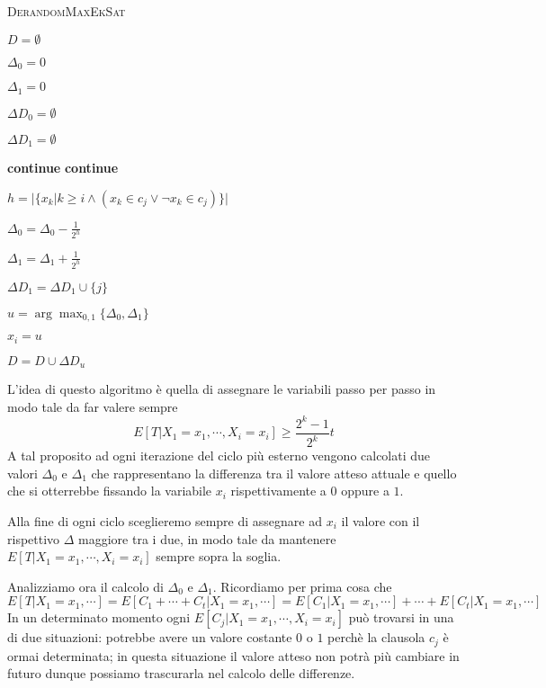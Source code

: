 \begin{algorithm}[h]
	\caption{\textsc{DerandomMaxEkSat}}
	\label{algo:DerandomMaxEkSat}

	$D = \emptyset$ 

	{
		$\Delta_0 = 0$

		$\Delta_1 = 0$

		$\Delta D_0 = \emptyset$

		$\Delta D_1 = \emptyset$

		{
			{
				\textbf{continue}
			}
			{
				\textbf{continue}
			}

			$h = |\{x_k | k \geq i \land (x_k \in c_j \lor \neg x_k \in c_j)\}|$ 

			{

				$\Delta_0 = \Delta_0 - \frac{1}{2^h}$

				$\Delta_1 = \Delta_1 + \frac{1}{2^h}$

				$\Delta D_1 = \Delta D_1 \cup \{j\}$

			} 

		}

		$ u = \arg \max_{0,1} \{\Delta_0, \Delta_1\}$

		$x_i = u$

		$D = D \cup \Delta D_u$
	}
\end{algorithm}
L'idea di questo algoritmo è quella di assegnare le variabili passo per passo
in modo tale da far valere sempre
$$
	E[T|X_1 = x_1, \cdots, X_i = x_i] \geq \frac{2^k-1}{2^k}t
$$
A tal proposito ad ogni iterazione del ciclo più esterno vengono calcolati due
valori $\Delta_0$ e $\Delta_1$ che rappresentano la differenza tra il valore
atteso attuale e quello che si otterrebbe fissando la variabile $x_i$
rispettivamente a $0$ oppure a $1$.

Alla fine di ogni ciclo sceglieremo sempre di assegnare ad $x_i$ il valore
con il rispettivo $\Delta$ maggiore tra i due, in modo tale da mantenere
$E[T|X_1 = x_1, \cdots, X_i = x_i]$ sempre sopra la soglia.

Analizziamo ora il calcolo di $\Delta_0$ e $\Delta_1$.
Ricordiamo per prima cosa che
$$
	E[T|X_1 = x_1, \cdots] = E[C_1 + \cdots + C_t | X_1=x_1, \cdots] = E[C_1 | X_1=x_1, \cdots] + \cdots + E[C_t | X_1=x_1, \cdots]
$$
In un determinato momento ogni $E[C_j | X_1=x_1, \cdots, X_i=x_i]$ può trovarsi
in una di due situazioni: potrebbe avere un valore costante $0$ o $1$ perchè la
clausola $c_j$ è ormai determinata; in questa situazione il valore atteso non
potrà più cambiare in futuro dunque possiamo trascurarla nel calcolo delle
differenze.

